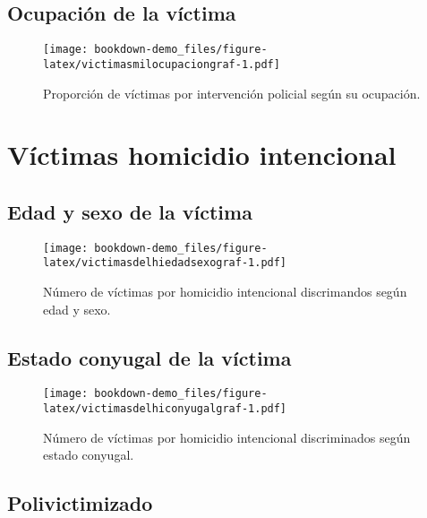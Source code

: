 \documentclass[
]{book}
\begin{document}
\hypertarget{ocupaciuxf3n-de-la-vuxedctima}{%
\section{Ocupación de la víctima}\label{ocupaciuxf3n-de-la-vuxedctima}}



\begin{figure}
\centering
\texttt{[image: bookdown-demo\_files/figure-latex/victimasmilocupaciongraf-1.pdf]}
\caption{\label{fig:victimasmilocupaciongraf}Proporción de víctimas por intervención policial según su ocupación.}
\end{figure}

\hypertarget{vuxedctimas-homicidio-intencional}{%
\chapter{Víctimas homicidio intencional}\label{vuxedctimas-homicidio-intencional}}

\hypertarget{edad-y-sexo-de-la-vuxedctima-1}{%
\section{Edad y sexo de la víctima}\label{edad-y-sexo-de-la-vuxedctima-1}}



\begin{figure}
\centering
\texttt{[image: bookdown-demo\_files/figure-latex/victimasdelhiedadsexograf-1.pdf]}
\caption{\label{fig:victimasdelhiedadsexograf}Número de víctimas por homicidio intencional discrimandos según edad y sexo.}
\end{figure}

\hypertarget{estado-conyugal-de-la-vuxedctima-1}{%
\section{Estado conyugal de la víctima}\label{estado-conyugal-de-la-vuxedctima-1}}



\begin{figure}
\centering
\texttt{[image: bookdown-demo\_files/figure-latex/victimasdelhiconyugalgraf-1.pdf]}
\caption{\label{fig:victimasdelhiconyugalgraf}Número de víctimas por homicidio intencional discriminados según estado conyugal.}
\end{figure}

\hypertarget{polivictimizado}{%
\section{Polivictimizado}\label{polivictimizado}}
\end{document}
